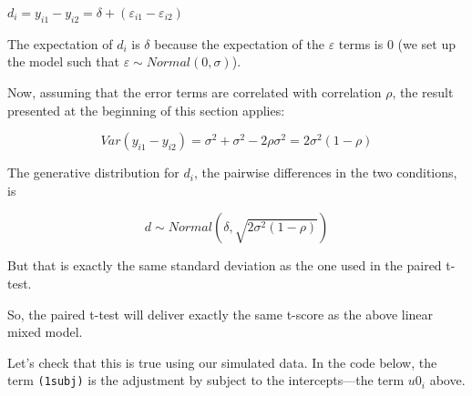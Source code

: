 \documentclass[12pt,]{krantz}
\newenvironment{Shaded}{\begin{snugshade}}{\end{snugshade}}
\newcommand{\DataTypeTok}[1]{\textcolor[rgb]{0.13,0.29,0.53}{#1}}
\newcommand{\DecValTok}[1]{\textcolor[rgb]{0.00,0.00,0.81}{#1}}
\newcommand{\KeywordTok}[1]{\textcolor[rgb]{0.13,0.29,0.53}{\textbf{#1}}}
\newcommand{\NormalTok}[1]{#1}
\newcommand{\OperatorTok}[1]{\textcolor[rgb]{0.81,0.36,0.00}{\textbf{#1}}}
\newcommand{\StringTok}[1]{\textcolor[rgb]{0.31,0.60,0.02}{#1}}
\begin{document}
\(d_i=y_{i1} - y_{i2}= \delta + (\varepsilon_{i1}-\varepsilon_{i2})\)

The expectation of \(d_i\) is \(\delta\) because the expectation of the \(\varepsilon\) terms is 0 (we set up the model such that \(\varepsilon \sim Normal(0,\sigma)\)).

Now, assuming that the error terms are correlated with correlation \(\rho\), the result presented at the beginning of this section applies:

\begin{equation}
Var(y_{i1}-y_{i2}) = \sigma^2 + \sigma^2-2\rho\sigma^2=2\sigma^2(1-\rho)
\end{equation}

The generative distribution for \(d_i\), the pairwise differences in the two conditions, is

\begin{equation}
d \sim Normal(\delta, \sqrt{2\sigma^2(1-\rho)})
\end{equation}

But that is exactly the same standard deviation as the one used in the paired t-test.

So, the paired t-test will deliver exactly the same t-score as the above linear mixed model.

Let's check that this is true using our simulated data. In the code below, the term \texttt{(1\textbar{}subj)} is the adjustment by subject to the intercepts---the term \(u0_i\) above.

\begin{Shaded}
\end{Shaded}
\end{document}
